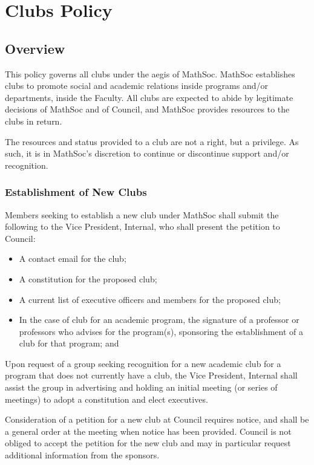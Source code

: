 \section{Clubs Policy}
\subsection{Overview}
This policy governs all clubs under the aegis of MathSoc. MathSoc establishes
clubs to promote social and academic relations inside programs and/or
departments, inside the Faculty. All clubs are expected to abide by legitimate
decisions of MathSoc and of Council, and MathSoc provides resources to the clubs
in return.

The resources and status provided to a club are not a right, but a privilege.
As such, it is in MathSoc's discretion to continue or discontinue support and/or
recognition.

\subsubsection{Establishment of New Clubs}
Members seeking to establish a new club under MathSoc shall submit the following
to the Vice President, Internal, who shall present the petition to Council:

\begin{itemize}
  \item A contact email for the club;
  \item A constitution for the proposed club;
  \item A current list of executive officers and members for the proposed club;
  \item In the case of club for an academic program, the signature of a
    professor or professors who advises for the program(s), sponsoring the
    establishment of a club for that program; and
\end{itemize}

Upon request of a group seeking recognition for a new academic club for a
program that does not currently have a club, the Vice President, Internal shall assist the
group in advertising and holding an initial meeting (or series of meetings) to
adopt a constitution and elect executives.

Consideration of a petition for a new club at Council requires notice, and shall
be a general order at the meeting when notice has been provided. Council is not
obliged to accept the petition for the new club and may in particular request
additional information from the sponsors.

